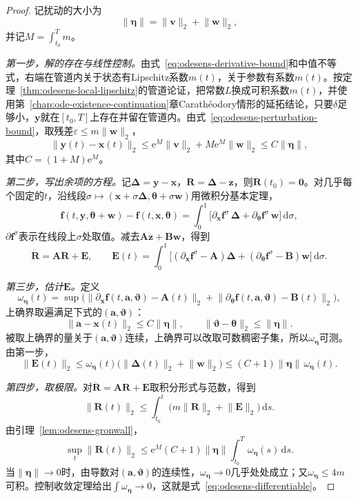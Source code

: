 \begin{proof}
记扰动的大小为
\[
 \lVert\bm{\eta}\rVert=\lVert\bm{v}\rVert_2+\lVert\bm{w}\rVert_2,
\]
并记$M=\int_{t_0}^{T}m$。

\emph{第一步，解的存在与线性控制。}由式~\eqref{eq:odesens-derivative-bound}和中值不等式，右端在管道内关于状态有Lipschitz系数$m(t)$，关于参数有系数$m(t)$。按定理~\ref{thm:odesens-local-lipschitz}的管道论证，把常数$L$换成可积系数$m(t)$，并使用第~\ref{chap:ode-existence-continuation}章Carathéodory情形的延拓结论，只要$\delta$足够小，$\bm{y}$就在$[t_0,T]$上存在并留在管道内。由式~\eqref{eq:odesens-perturbation-bound}，取残差$\varepsilon\leq m\lVert\bm{w}\rVert_2$，
\[
 \lVert\bm{y}(t)-\bm{x}(t)\rVert_2\leq\mathrm{e}^{M}\lVert\bm{v}\rVert_2+M\mathrm{e}^{M}\lVert\bm{w}\rVert_2\leq C\lVert\bm{\eta}\rVert,
\]
其中$C=(1+M)\mathrm{e}^{M}$。

\emph{第二步，写出余项的方程。}记$\bm{\Delta}=\bm{y}-\bm{x}$，$\bm{R}=\bm{\Delta}-\bm{z}$，则$\bm{R}(t_0)=\bm{0}$。对几乎每个固定的$t$，沿线段$\sigma\mapsto(\bm{x}+\sigma\bm{\Delta},\bm{\theta}+\sigma\bm{w})$用微积分基本定理，
\[
 \bm{f}(t,\bm{y},\bm{\theta}+\bm{w})-\bm{f}(t,\bm{x},\bm{\theta})
 =\int_0^1\bigl[\partial_{\bm{x}}\bm{f}^{\sigma}\,\bm{\Delta}+\partial_{\bm{\theta}}\bm{f}^{\sigma}\,\bm{w}\bigr]\,\mathrm{d}\sigma,
\]
$\partial\bm{f}^{\sigma}$表示在线段上$\sigma$处取值。减去$\bm{A}\bm{z}+\bm{B}\bm{w}$，得到
\[
 \dot{\bm{R}}=\bm{A}\bm{R}+\bm{E},\qquad
 \bm{E}(t)=\int_0^1\bigl[(\partial_{\bm{x}}\bm{f}^{\sigma}-\bm{A})\bm{\Delta}+(\partial_{\bm{\theta}}\bm{f}^{\sigma}-\bm{B})\bm{w}\bigr]\,\mathrm{d}\sigma.
\]

\emph{第三步，估计$\bm{E}$。}定义
\[
 \omega_{\bm{\eta}}(t)=\sup\bigl(\lVert\partial_{\bm{x}}\bm{f}(t,\bm{a},\bm{\vartheta})-\bm{A}(t)\rVert_2+\lVert\partial_{\bm{\theta}}\bm{f}(t,\bm{a},\bm{\vartheta})-\bm{B}(t)\rVert_2\bigr),
\]
上确界取遍满足下式的$(\bm{a},\bm{\vartheta})$：
\[
 \lVert\bm{a}-\bm{x}(t)\rVert_2\leq C\lVert\bm{\eta}\rVert,\qquad\lVert\bm{\vartheta}-\bm{\theta}\rVert_2\leq\lVert\bm{\eta}\rVert.
\]
被取上确界的量关于$(\bm{a},\bm{\vartheta})$连续，上确界可以改取可数稠密子集，所以$\omega_{\bm{\eta}}$可测。由第一步，
\[
 \lVert\bm{E}(t)\rVert_2\leq\omega_{\bm{\eta}}(t)\bigl(\lVert\bm{\Delta}(t)\rVert_2+\lVert\bm{w}\rVert_2\bigr)\leq(C+1)\lVert\bm{\eta}\rVert\,\omega_{\bm{\eta}}(t).
\]

\emph{第四步，取极限。}对$\dot{\bm{R}}=\bm{A}\bm{R}+\bm{E}$取积分形式与范数，得到
\[
 \lVert\bm{R}(t)\rVert_2\leq\int_{t_0}^{t}\bigl(m\lVert\bm{R}\rVert_2+\lVert\bm{E}\rVert_2\bigr)\,\mathrm{d}s.
\]
由引理~\ref{lem:odesens-gronwall}，
\[
 \sup_{t}\lVert\bm{R}(t)\rVert_2\leq\mathrm{e}^{M}(C+1)\lVert\bm{\eta}\rVert\int_{t_0}^{T}\omega_{\bm{\eta}}(s)\,\mathrm{d}s.
\]
当$\lVert\bm{\eta}\rVert\to0$时，由导数对$(\bm{a},\bm{\vartheta})$的连续性，$\omega_{\bm{\eta}}\to0$几乎处处成立；又$\omega_{\bm{\eta}}\leq4m$可积。控制收敛定理给出$\int\omega_{\bm{\eta}}\to0$，这就是式~\eqref{eq:odesens-differentiable}。
\end{proof}

